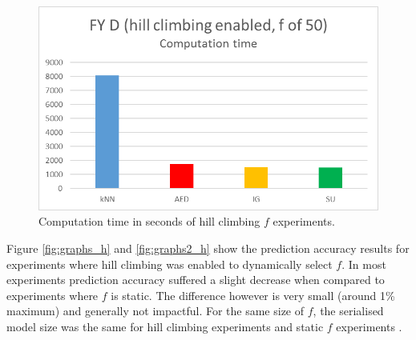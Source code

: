 \begin{figure}[h]
\includegraphics[scale=0.17]{Graphs/FY_D/H_time}
\caption{Computation time in seconds of hill climbing $f$ experiments.}
\label{fig:time_h}
\end{figure}

Figure \ref{fig:graphs_h} and \ref{fig:graphs2_h} show the prediction accuracy results for experiments where hill climbing was enabled to dynamically select $f$. In most experiments prediction accuracy suffered a slight decrease when compared to experiments where $f$ is static. The difference however is very small (around 1\% maximum) and generally not impactful. For the same size of $f$, the serialised model size was the same for hill climbing experiments and static $f$ experiments .



